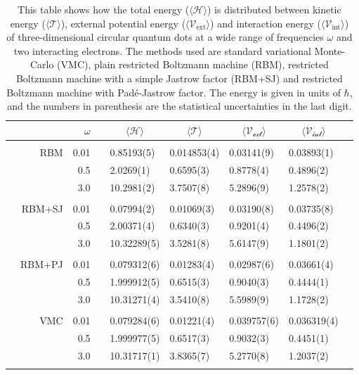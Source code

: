 \begin{table}
	\caption{This table shows how the total energy ($\langle\mathcal{H}\rangle$) is distributed between kinetic energy ($\langle\mathcal{T}\rangle$), external potential energy ($\langle\mathcal{V}_{\text{ext}}\rangle$) and interaction energy ($\langle\mathcal{V}_{\text{int}}\rangle$) of three-dimensional circular quantum dots at a wide range of frequencies $\omega$ and two interacting electrons. The methods used are standard variational Monte-Carlo (VMC), plain restricted Boltzmann machine (RBM), restricted Boltzmann machine with a simple Jastrow factor (RBM+SJ) and restricted Boltzmann machine with Padé-Jastrow factor. The energy is given in units of $\hbar$, and the numbers in parenthesis are the statistical uncertainties in the last digit.}
	\label{tab:splitfrequencyQD3D2P}
	\begin{tabularx}{\textwidth}{R{1cm}rrcR{2.3cm}R{2.3cm}R{2.3cm}R{2.3cm}R{0.3cm}} \hline\hline
		&\makecell{\\ \phantom{$N$} \\ \phantom{=}} & $\omega$ &&  &  &  &  \\ \hline \\
		&RBM & 0.01 && 0.85193(5) & 0.014853(4) & 0.03141(9) & 0.03893(1) \\
		&& 0.5 && 2.0269(1) & 0.6595(3) & 0.8778(4) & 0.4896(2) \\
		&& 3.0 && 10.2981(2) & 3.7507(8) & 5.2896(9) & 1.2578(2) \\ \hdashline \\
		
		&RBM+SJ & 0.01 && 0.07994(2) & 0.01069(3) & 0.03190(8) & 0.03735(8) \\
		&& 0.5 && 2.00371(4) & 0.6340(3) & 0.9201(4) & 0.4496(2) \\
		&& 3.0 && 10.32289(5) & 3.5281(8) & 5.6147(9) & 1.1801(2) \\ \hdashline \\
		
		&RBM+PJ & 0.01 && 0.079312(6) & 0.01283(4) & 0.02987(6) & 0.03661(4) \\
		&& 0.5 && 1.999912(5) & 0.6515(3) & 0.9040(3) & 0.4444(1) \\
		&& 3.0 && 10.31271(4) & 3.5410(8) & 5.5989(9) & 1.1728(2) \\ \hdashline \\
		
		&VMC & 0.01 && 0.079284(6) & 0.01221(4) & 0.039757(6) & 0.036319(4) \\
		&& 0.5 && 1.999977(5) & 0.6517(3) & 0.9032(3) & 0.4451(1) \\
		&& 3.0 && 10.31717(1) & 3.8365(7) & 5.2770(8) & 1.2037(2) \\ \hdashline \\
	\end{tabularx}
\end{table} 


